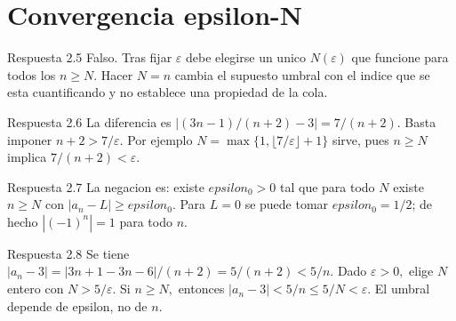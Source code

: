 \documentclass[10pt,a4paper,oneside,openany]{book}
\begin{document}
\section{Convergencia epsilon-N}
\begin{PSevenAnswerFixed}{Respuesta 2.5}
Falso. Tras fijar \(\varepsilon \) debe elegirse un unico \(N(\varepsilon )\) que funcione para todos los \(n\ge N\). Hacer \(N=n\) cambia el supuesto umbral con el indice que se esta cuantificando y no establece una propiedad de la cola.
\end{PSevenAnswerFixed}
\begin{PSevenAnswerFixed}{Respuesta 2.6}
La diferencia es \(|(3n-1)/(n+2)-3|=7/(n+2)\). Basta imponer \(n+2>7/\varepsilon \). Por ejemplo \(N=\max\{1,\lfloor 7/\varepsilon \rfloor +1\}\) sirve, pues \(n\ge N\) implica \(7/(n+2)<\varepsilon \).
\end{PSevenAnswerFixed}
\begin{PSevenAnswerFixed}{Respuesta 2.7}
La negacion es: existe \(epsilon_0>0\) tal que para todo \(N\) existe \(n\ge N\) con \(|a_n-L|\ge epsilon_0\). Para \(L=0\) se puede tomar \(epsilon_0=1/2\); de hecho \(|(-1)^n|=1\) para todo \(n\).
\end{PSevenAnswerFixed}
\begin{PSevenAnswerFixed}{Respuesta 2.8}
Se tiene \(|a_n-3|=|3n+1-3n-6|/(n+2)=5/(n+2)<5/n\). Dado \(\varepsilon >0,\) elige \(N\) entero con \(N>5/\varepsilon \). Si \(n\ge N,\) entonces \(|a_n-3|<5/n\le 5/N<\varepsilon \). El umbral depende de epsilon, no de \(n\).
\end{PSevenAnswerFixed}
\end{document}
